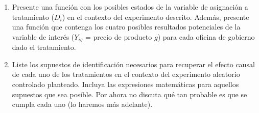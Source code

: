 \documentclass[a4paper, answers, addpoints, 11pt]{exam}
\begin{document}
\begin{enumerate}
    \item Presente una función con los posibles estados de la variable de asignación a tratamiento ($D_i$) en el contexto del experimento descrito. Además, presente una función que contenga los cuatro posibles resultados potenciales de la variable de interés ($Y_{ig}$ = precio de producto $g$) para cada oficina de gobierno dado el tratamiento. 
   
    \item Liste los supuestos de identificación necesarios para recuperar el efecto causal de cada uno de los tratamientos en el contexto del experimento aleatorio controlado planteado. Incluya las expresiones matemáticas para aquellos supuestos que sea posible. Por ahora no discuta qué tan probable es que se cumpla cada uno (lo haremos más adelante). 

   


\end{enumerate}
\end{document}
